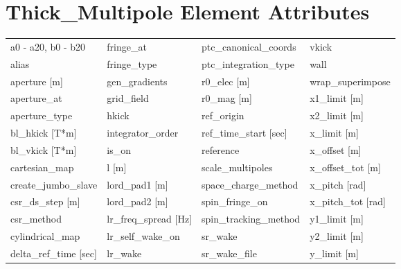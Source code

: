  \section{Thick_Multipole Element Attributes}
 \label{s:list.thick.multipole}
 
 \begin{tabular}{llll} \toprule
a0 - a20, b0 - b20               & fringe_at                        & ptc_canonical_coords             & vkick                            \\
alias                            & fringe_type                      & ptc_integration_type             & wall                             \\
aperture [m]                     & gen_gradients                    & r0_elec [m]                      & wrap_superimpose                 \\
aperture_at                      & grid_field                       & r0_mag [m]                       & x1_limit [m]                     \\
aperture_type                    & hkick                            & ref_origin                       & x2_limit [m]                     \\
bl_hkick [T*m]                   & integrator_order                 & ref_time_start [sec]             & x_limit [m]                      \\
bl_vkick [T*m]                   & is_on                            & reference                        & x_offset [m]                     \\
cartesian_map                    & l [m]                            & scale_multipoles                 & x_offset_tot [m]                 \\
create_jumbo_slave               & lord_pad1 [m]                    & space_charge_method              & x_pitch [rad]                    \\
csr_ds_step [m]                  & lord_pad2 [m]                    & spin_fringe_on                   & x_pitch_tot [rad]                \\
csr_method                       & lr_freq_spread [Hz]              & spin_tracking_method             & y1_limit [m]                     \\
cylindrical_map                  & lr_self_wake_on                  & sr_wake                          & y2_limit [m]                     \\
delta_ref_time [sec]             & lr_wake                          & sr_wake_file                     & y_limit [m]                      \\

\end{tabular}

